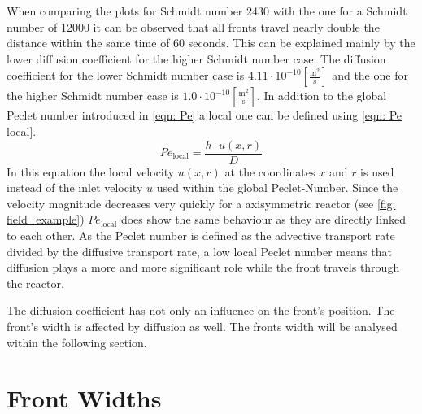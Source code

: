 \documentclass[../thesis.tex]{subfiles}
\begin{document}
When comparing the plots for Schmidt number 2430 with the one for a Schmidt number of 12000 it can be observed that all fronts travel nearly double the distance within the same time of 60 seconds. This can be explained mainly by the lower diffusion coefficient for the higher Schmidt number case. The diffusion coefficient for the lower Schmidt number case is $4 \text{.}11 \cdot 10^{-10} \left[ \frac{\mathrm{m^2}}{\mathrm{s}} \right]$ and the one for the higher Schmidt number case is $1\text{.}0 \cdot 10^{-10} \left[ \frac{\mathrm{m^2}}{\mathrm{s}} \right]$. In addition to the global Peclet number introduced in \autoref{eqn: Pe} a local one can be defined using \autoref{eqn: Pe local}.
\begin{equation}
	Pe_{\text{local}} = \dfrac{h \cdot u(x,r)}{D}
	\label{eqn: Pe local}
\end{equation}
In this equation the local velocity $u(x,r)$ at the coordinates $x$ and $r$ is used instead of the inlet velocity $u$ used within the global Peclet-Number.
Since the velocity magnitude decreases very quickly for a axisymmetric reactor (see \autoref{fig: field_example}) $Pe_{\text{local}}$ does show the same behaviour as they are directly linked to each other. As the Peclet number is defined as the advective transport rate divided by the diffusive transport rate, a low local Peclet number means that diffusion plays a more and more significant role while the front travels through the reactor. 

The diffusion coefficient has not only an influence on the front's position. The front's width is affected by diffusion as well. The fronts width will be analysed within the following section.

\section{Front Widths}
\end{document}
